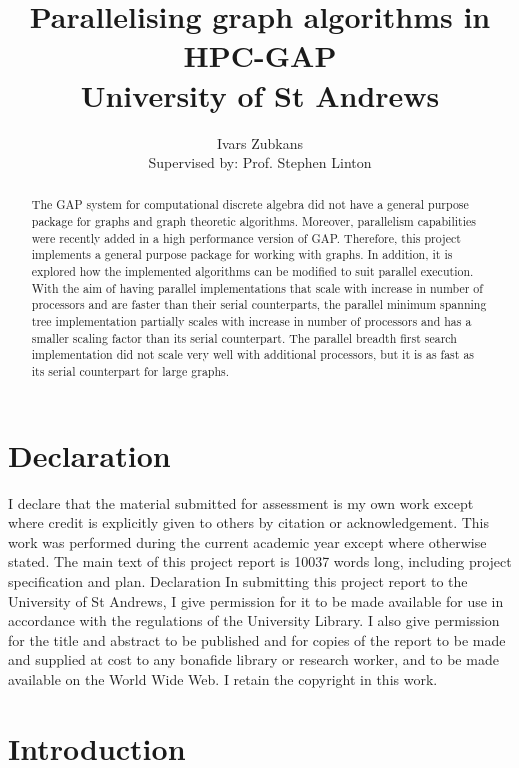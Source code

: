 \documentclass{report}
\title{Parallelising graph algorithms in HPC-GAP \\ \vspace{2 mm} {\large University of St Andrews}}
\author{Ivars Zubkans \\ \small Supervised by: Prof. Stephen Linton}
\theoremstyle{plain}
\theoremstyle{definition}
\theoremstyle{remark}
\begin{document}
\maketitle

\begin{abstract}
The GAP system for computational discrete algebra did not have a general purpose package for graphs and graph theoretic algorithms. Moreover, parallelism capabilities were recently added in a high performance version of GAP. Therefore, this project implements a general purpose package for working with graphs. In addition, it is explored how the implemented algorithms can be modified to suit parallel execution. With the aim of having parallel implementations that scale with increase in number of processors and are faster than their serial counterparts, the parallel minimum spanning tree implementation partially scales with increase in number of processors and has a smaller scaling factor than its serial counterpart. The parallel breadth first search implementation did not scale very well with additional processors, but it is as fast as its serial counterpart for large graphs.
\end{abstract}

\chapter*{Declaration}
I declare that the material submitted for assessment is
my own work except where credit is explicitly given to others
by citation or acknowledgement. This work was performed during
the current academic year except where otherwise stated.
The main text of this project report is 10037 words long,
including project specification and plan.
Declaration
In submitting this project report to the University of St Andrews,
I give permission for it to be made available for use in
accordance with the regulations of the University Library. I
also give permission for the title and abstract to be published and
for copies of the report to be made and supplied at cost to any bonafide library or research worker, and to be made available on the
World Wide Web. I retain the copyright in this work.

\tableofcontents

\chapter{Introduction}
\end{document}
